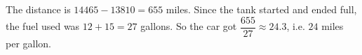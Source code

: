 The distance is $14465-13810=655$ miles. Since the tank started and ended full, the fuel used was $12+15=27$ gallons. So the car got $\dfrac{655}{27}\approx24.3$, i.e. $\boxed{24}$ miles per gallon.
